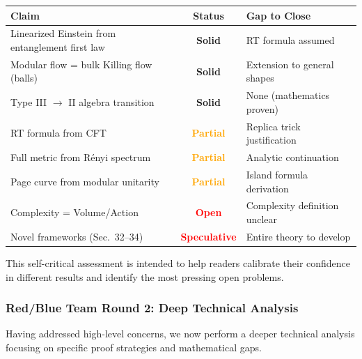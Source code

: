 \documentclass[12pt,a4paper]{article}
\begin{document}
\begin{center}
\begin{tabular}{|p{6cm}|c|p{5.5cm}|}
\hline
\textbf{Claim} & \textbf{Status} & \textbf{Gap to Close} \\
\hline
Linearized Einstein from entanglement first law & \textcolor{green!50!black}{\textbf{Solid}} & RT formula assumed \\
\hline
Modular flow = bulk Killing flow (balls) & \textcolor{green!50!black}{\textbf{Solid}} & Extension to general shapes \\
\hline
Type III $\to$ II algebra transition & \textcolor{green!50!black}{\textbf{Solid}} & None (mathematics proven) \\
\hline
RT formula from CFT & \textcolor{orange}{\textbf{Partial}} & Replica trick justification \\
\hline
Full metric from R\'enyi spectrum & \textcolor{orange}{\textbf{Partial}} & Analytic continuation \\
\hline
Page curve from modular unitarity & \textcolor{orange}{\textbf{Partial}} & Island formula derivation \\
\hline
Complexity = Volume/Action & \textcolor{red}{\textbf{Open}} & Complexity definition unclear \\
\hline
Novel frameworks (Sec.\ 32--34) & \textcolor{red}{\textbf{Speculative}} & Entire theory to develop \\
\hline
\end{tabular}
\end{center}

This self-critical assessment is intended to help readers calibrate their confidence in different results and identify the most pressing open problems.

\subsubsection{Red/Blue Team Round 2: Deep Technical Analysis}

Having addressed high-level concerns, we now perform a deeper technical analysis focusing on specific proof strategies and mathematical gaps.
\end{document}
